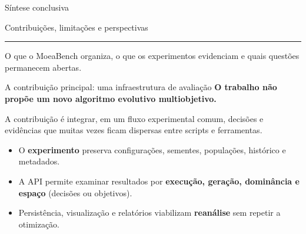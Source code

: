 \setlength{\parskip}{4pt}

\begin{frame}[plain]
\vspace*{1.84cm}
{\LARGE\color{navy}Síntese conclusiva\par}
\vspace{.25cm}
{\large Contribuições, limitações e perspectivas\par}
\vspace{.30cm}
\textcolor{navy!40}{\rule{.76\linewidth}{.6pt}}\par
\vspace{.22cm}
O que o MoeaBench organiza, o que os experimentos evidenciam e quais questões permanecem abertas.
\end{frame}

\begin{frame}{A contribuição principal: uma infraestrutura de avaliação}
\textbf{O trabalho não propõe um novo algoritmo evolutivo multiobjetivo.}
\par\medskip
A contribuição é integrar, em um fluxo experimental comum, decisões e evidências que muitas vezes ficam dispersas entre scripts e ferramentas.
\vspace{.22cm}
\begin{center}
\end{center}
\vspace{.15cm}
\begin{itemize}\setlength\itemsep{4pt}
\item O \textbf{experimento} preserva configurações, sementes, populações, histórico e metadados.
\item A API permite examinar resultados por \textbf{execução, geração, dominância e espaço} (decisões ou objetivos).
\item Persistência, visualização e relatórios viabilizam \textbf{reanálise} sem repetir a otimização.
\end{itemize}
\end{frame}

